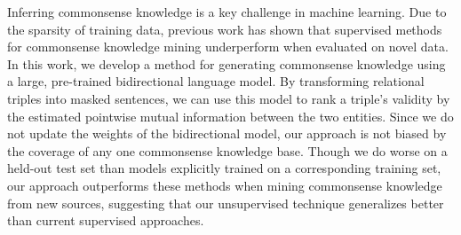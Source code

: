 Inferring commonsense knowledge is a key challenge in machine learning. Due to the sparsity of training data, previous work has shown that supervised methods for commonsense knowledge mining underperform when evaluated on novel data. In this work, we develop a method for generating commonsense knowledge using a large, pre-trained bidirectional language model. By transforming relational triples into masked sentences, we can use this model to rank a triple's validity by the estimated pointwise mutual information between the two entities. Since we do not update the weights of the bidirectional model, our approach is not biased by the coverage of any one commonsense knowledge base. Though we do worse on a held-out test set than models explicitly trained on a corresponding training set, our approach outperforms these methods when mining commonsense knowledge from new sources, suggesting that our unsupervised technique generalizes better than current supervised approaches.